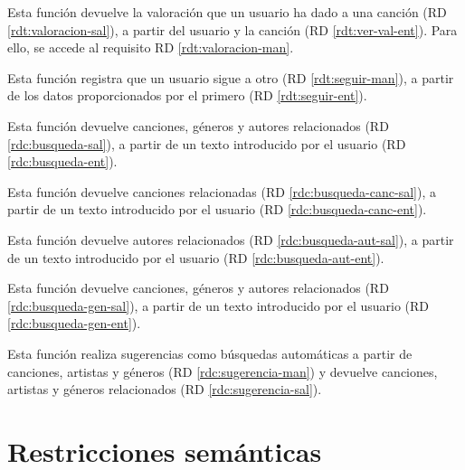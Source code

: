 Esta función devuelve la valoración que un usuario ha dado a una canción (RD \ref{rdt:valoracion-sal}), a partir del usuario y la canción (RD \ref{rdt:ver-val-ent}). Para ello, se accede al requisito RD \ref{rdt:valoracion-man}.

Esta función registra que un usuario sigue a otro (RD \ref{rdt:seguir-man}), a partir de los datos proporcionados por el primero (RD \ref{rdt:seguir-ent}).




Esta función devuelve canciones, géneros y autores relacionados (RD \ref{rdc:busqueda-sal}), a partir de un texto introducido por el usuario (RD \ref{rdc:busqueda-ent}).

Esta función devuelve canciones relacionadas (RD \ref{rdc:busqueda-canc-sal}), a partir de un texto introducido por el usuario (RD \ref{rdc:busqueda-canc-ent}).

Esta función devuelve autores relacionados (RD \ref{rdc:busqueda-aut-sal}), a partir de un texto introducido por el usuario (RD \ref{rdc:busqueda-aut-ent}).

Esta función devuelve canciones, géneros y autores relacionados (RD \ref{rdc:busqueda-gen-sal}), a partir de un texto introducido por el usuario (RD \ref{rdc:busqueda-gen-ent}).

Esta función realiza sugerencias como búsquedas automáticas a partir de canciones, artistas y géneros (RD \ref{rdc:sugerencia-man}) y devuelve canciones, artistas y géneros relacionados (RD \ref{rdc:sugerencia-sal}).

\section{Restricciones semánticas}

